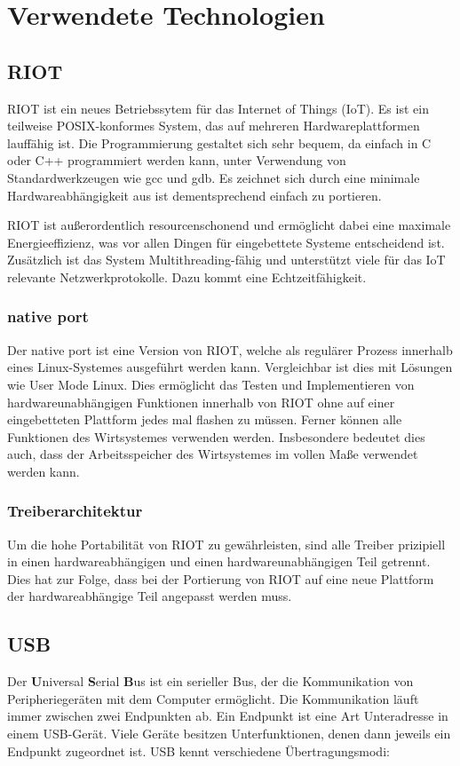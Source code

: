\section{Verwendete Technologien}

\subsection{RIOT}
RIOT ist ein neues Betriebssytem für das Internet of Things (IoT).
Es ist ein teilweise POSIX-konformes System, das auf mehreren Hardwareplattformen lauffähig ist.
Die Programmierung gestaltet sich sehr bequem, da einfach in C oder C++ programmiert werden kann, unter Verwendung von Standardwerkzeugen wie gcc und gdb.
Es zeichnet sich durch eine minimale Hardwareabhängigkeit aus ist dementsprechend einfach zu portieren.

RIOT ist außerordentlich resourcenschonend und ermöglicht dabei eine maximale Energieeffizienz, was vor allen Dingen für eingebettete Systeme entscheidend ist.
Zusätzlich ist das System Multithreading-fähig und unterstützt viele für das IoT relevante Netzwerkprotokolle. Dazu kommt eine Echtzeitfähigkeit.

\subsubsection{native port}
\label{section:native_port}
Der native port ist eine Version von RIOT, welche als regulärer Prozess innerhalb eines Linux-Systemes ausgeführt werden kann.
Vergleichbar ist dies mit Lösungen wie User Mode Linux.
Dies ermöglicht das Testen und Implementieren von hardwareunabhängigen Funktionen innerhalb von RIOT ohne auf einer eingebetteten Plattform jedes mal flashen zu müssen.
Ferner können alle Funktionen des Wirtsystemes verwenden werden.
Insbesondere bedeutet dies auch, dass der Arbeitsspeicher des Wirtsystemes im vollen Maße verwendet werden kann.

\subsubsection{Treiberarchitektur}
Um die hohe Portabilität von RIOT zu gewährleisten, sind alle Treiber prizipiell in einen hardwareabhängigen und einen hardwareunabhängigen Teil getrennt.
Dies hat zur Folge, dass bei der Portierung von RIOT auf eine neue Plattform der hardwareabhängige Teil angepasst werden muss.

\subsection{USB}
Der \textbf{U}niversal \textbf{S}erial \textbf{B}us ist ein serieller Bus, der die Kommunikation von Peripheriegeräten mit dem Computer ermöglicht.
Die Kommunikation läuft immer zwischen zwei Endpunkten ab.
Ein Endpunkt ist eine Art Unteradresse in einem USB-Gerät.
Viele Geräte besitzen Unterfunktionen, denen dann jeweils ein Endpunkt zugeordnet ist.
USB kennt verschiedene Übertragungsmodi:


